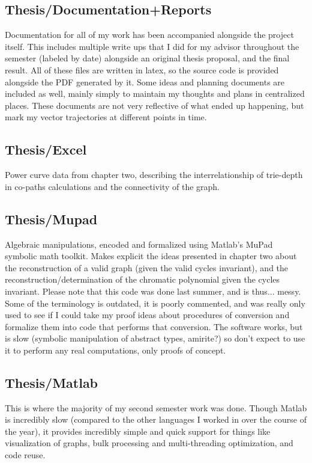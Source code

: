 \subsection*{Thesis/Documentation+Reports}

Documentation for all of my work has been accompanied alongside the project itself.
This includes multiple write ups that I did for my advisor throughout the semester (labeled by date) alongside an original thesis proposal, and the final result.
All of these files are written in latex, so the source code is provided alongside the PDF generated by it. 
Some ideas and planning documents are included as well, mainly simply to maintain my thoughts and plans in centralized places.
These documents are not very reflective of what ended up happening, but mark my vector trajectories at different points in time.

\subsection*{Thesis/Excel}

Power curve data from chapter two, describing the interrelationship of trie-depth in co-paths calculations and the connectivity of the graph.

\subsection*{Thesis/Mupad}

Algebraic manipulations, encoded and formalized using Matlab's MuPad symbolic math toolkit.
Makes explicit the ideas presented in chapter two about the reconstruction of a valid graph (given the valid cycles invariant), and the reconstruction/determination of the chromatic polynomial given the cycles invariant.
Please note that this code was done last summer, and is thus... messy.
Some of the terminology is outdated, it is poorly commented, and was really only used to see if I could take my proof ideas about procedures of conversion and formalize them into code that performs that conversion.
The software works, but is slow (symbolic manipulation of abstract types, amirite?) so don't expect to use it to perform any real computations, only proofs of concept.

\subsection*{Thesis/Matlab}

This is where the majority of my second semester work was done.
Though Matlab is incredibly slow (compared to the other languages I worked in over the course of the year), it provides incredibly simple and quick support for things like visualization of graphs, bulk processing and multi-threading optimization, and code reuse.

